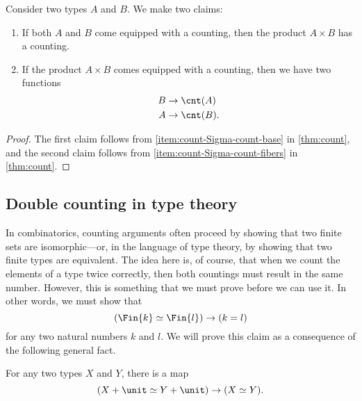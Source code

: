 \begin{cor}\label{cor:count-prod}
  Consider two types $A$ and $B$. We make two claims:
  \begin{enumerate}
  \item If both $A$ and $B$ come equipped with a counting, then the product $A\times B$ has a counting.
  \item If the product $A\times B$ comes equipped with a counting, then we have two functions
    \begin{align*}
      B & \to \cnt(A) \\
      A & \to \cnt(B).
    \end{align*}
  \end{enumerate}
\end{cor}

\begin{proof}
  The first claim follows from \ref{item:count-Sigma-count-base} in \cref{thm:count}, and the second claim follows from \ref{item:count-Sigma-count-fibers} in \cref{thm:count}. 
\end{proof}

\subsection{Double counting in type theory}

In combinatorics, counting arguments often proceed by showing that two finite sets are isomorphic---or, in the language of type theory, by showing that two finite types are equivalent. The idea here is, of course, that when we count the elements of a type twice correctly, then both countings must result in the same number. However, this is something that we must prove before we can use it. In other words, we must show that
\begin{equation*}
  (\Fin{k}\simeq\Fin{l})\to (k=l)
\end{equation*}
for any two natural numbers $k$ and $l$. We will prove this claim as a consequence of the following general fact.

\begin{prp}\label{prp:is-injective-maybe}
  For any two types $X$ and $Y$, there is a map
  \begin{equation*}
    (X+\unit\simeq Y+\unit)\to (X\simeq Y).
  \end{equation*}
\end{prp}

